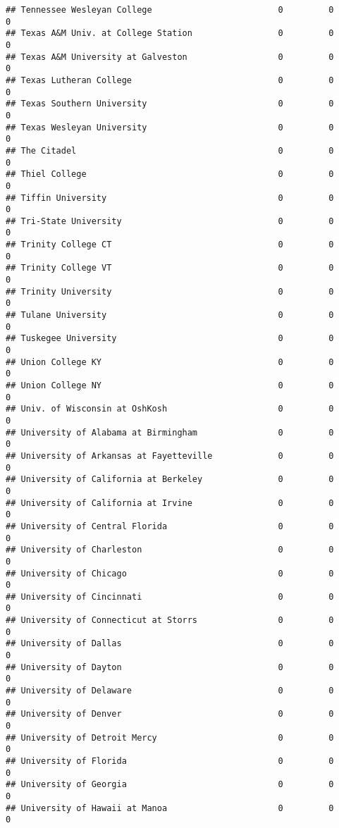 \documentclass[
]{article}
\begin{document}
\begin{verbatim}
## Tennessee Wesleyan College                         0         0         0
## Texas A&M Univ. at College Station                 0         0         0
## Texas A&M University at Galveston                  0         0         0
## Texas Lutheran College                             0         0         0
## Texas Southern University                          0         0         0
## Texas Wesleyan University                          0         0         0
## The Citadel                                        0         0         0
## Thiel College                                      0         0         0
## Tiffin University                                  0         0         0
## Tri-State University                               0         0         0
## Trinity College CT                                 0         0         0
## Trinity College VT                                 0         0         0
## Trinity University                                 0         0         0
## Tulane University                                  0         0         0
## Tuskegee University                                0         0         0
## Union College KY                                   0         0         0
## Union College NY                                   0         0         0
## Univ. of Wisconsin at OshKosh                      0         0         0
## University of Alabama at Birmingham                0         0         0
## University of Arkansas at Fayetteville             0         0         0
## University of California at Berkeley               0         0         0
## University of California at Irvine                 0         0         0
## University of Central Florida                      0         0         0
## University of Charleston                           0         0         0
## University of Chicago                              0         0         0
## University of Cincinnati                           0         0         0
## University of Connecticut at Storrs                0         0         0
## University of Dallas                               0         0         0
## University of Dayton                               0         0         0
## University of Delaware                             0         0         0
## University of Denver                               0         0         0
## University of Detroit Mercy                        0         0         0
## University of Florida                              0         0         0
## University of Georgia                              0         0         0
## University of Hawaii at Manoa                      0         0         0

\end{verbatim}
\end{document}
